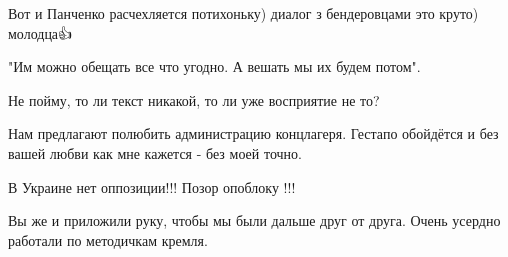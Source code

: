 \begin{itemize}
 
Вот и Панченко расчехляется потихоньку) диалог з бендеровцами это круто) молодца👍

 
"Им можно обещать все что угодно. А вешать мы их будем потом".

 
Не пойму, то ли текст никакой, то ли уже восприятие не то?

 
Нам предлагают полюбить администрацию концлагеря. Гестапо обойдётся и без вашей любви как мне кажется - без моей точно.

 
В Украине нет оппозиции!!! Позор опоблоку !!!

 
Вы же и приложили руку, чтобы мы были дальше друг от друга. Очень усердно работали по методичкам кремля.

 

\end{itemize}
